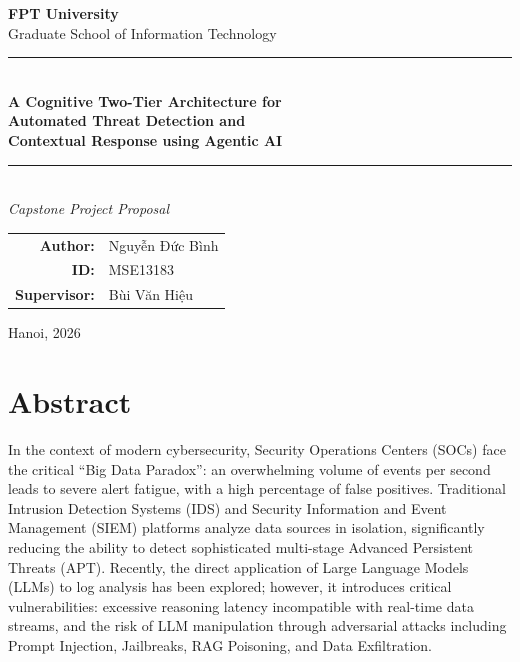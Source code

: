 \documentclass[12pt,a4paper]{article}
\begin{document}
\begin{titlepage}
    \centering

    \vspace*{1cm}
    {\large\textbf{FPT University}}\\[0.5cm]
    {\normalsize Graduate School of Information Technology}\\[2cm]

    \rule{\textwidth}{0.5pt}\\[0.5cm]
    {\LARGE\textbf{A Cognitive Two-Tier Architecture for\\Automated Threat Detection and\\Contextual Response using Agentic AI}}\\[0.5cm]
    \rule{\textwidth}{0.5pt}\\[1cm]

    {\large\textit{Capstone Project Proposal}}\\[2cm]

    \begin{tabular}{rl}
        \textbf{Author:}     & Nguyễn Đức Bình \\
        \textbf{ID:}         & MSE13183        \\[0.5cm]
        \textbf{Supervisor:} & Bùi Văn Hiệu    \\
    \end{tabular}

    \vfill
    {\normalsize Hanoi, 2026}

\end{titlepage}

\newpage
{}
\section*{Abstract}
In the context of modern cybersecurity, Security Operations Centers (SOCs) face the critical ``Big Data Paradox'': an overwhelming volume of events per second leads to severe alert fatigue, with a high percentage of false positives. Traditional Intrusion Detection Systems (IDS) and Security Information and Event Management (SIEM) platforms analyze data sources in isolation, significantly reducing the ability to detect sophisticated multi-stage Advanced Persistent Threats (APT). Recently, the direct application of Large Language Models (LLMs) to log analysis has been explored; however, it introduces critical vulnerabilities: excessive reasoning latency incompatible with real-time data streams, and the risk of LLM manipulation through adversarial attacks including Prompt Injection, Jailbreaks, RAG Poisoning, and Data Exfiltration.
\end{document}
